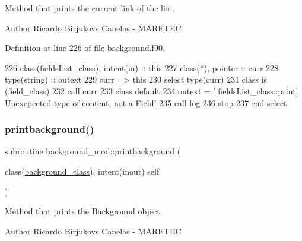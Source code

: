 Method that prints the current link of the list. 

\begin{DoxyAuthor}{Author}
Ricardo Birjukovs Canelas -\/ M\+A\+R\+E\+T\+EC 
\end{DoxyAuthor}


Definition at line 226 of file background.\+f90.


\begin{DoxyCode}
226     \textcolor{keywordtype}{class}(fieldsList\_class), \textcolor{keywordtype}{intent(in)} :: this
227     \textcolor{keywordtype}{class}(*), \textcolor{keywordtype}{pointer} :: curr
228     \textcolor{keywordtype}{type}(string) :: outext
229     curr => this%
230     \textcolor{keywordflow}{select type}(curr)
231 \textcolor{keywordflow}{    class is} (field\_class)
232         \textcolor{keyword}{call }curr%
233 \textcolor{keywordflow}{        class default}
234         outext = \textcolor{stringliteral}{'[fieldsList\_class::print] Unexepected type of content, not a Field'}
235         \textcolor{keyword}{call }log%
236         stop
237 \textcolor{keywordflow}{    end select}
\end{DoxyCode}
\mbox{\label{namespacebackground__mod_a8a8f225cffcddb742f22a402155b703f}} 
\subsubsection{\texorpdfstring{printbackground()}{printbackground()}}
{\footnotesize\ttfamily subroutine background\+\_\+mod\+::printbackground (\begin{DoxyParamCaption}\item[{class(\mbox{\hyperlink{structbackground__mod_1_1background__class}{background\+\_\+class}}), intent(inout)}]{self }\end{DoxyParamCaption})\hspace{0.3cm}{\ttfamily [private]}}



Method that prints the Background object. 

\begin{DoxyAuthor}{Author}
Ricardo Birjukovs Canelas -\/ M\+A\+R\+E\+T\+EC 
\end{DoxyAuthor}


